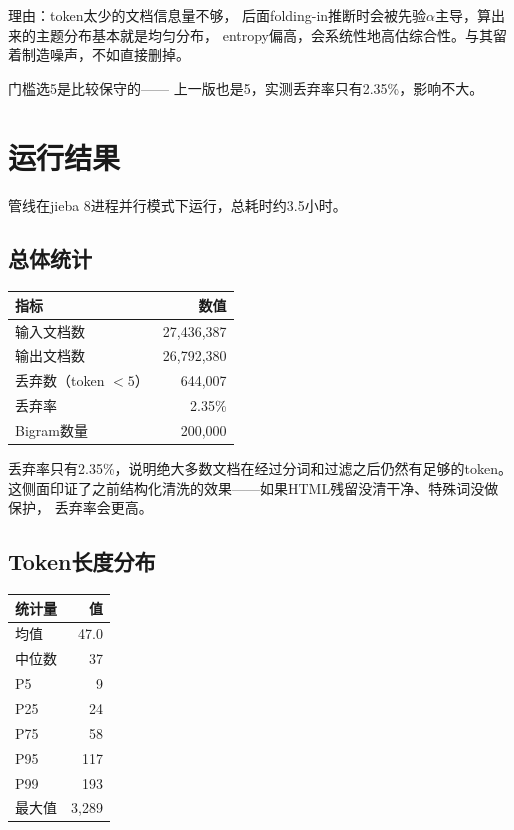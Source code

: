 \documentclass[12pt,a4paper]{ctexart}
\begin{document}
理由：token太少的文档信息量不够，
后面folding-in推断时会被先验$\alpha$主导，算出来的主题分布基本就是均匀分布，
entropy偏高，会系统性地高估综合性。与其留着制造噪声，不如直接删掉。

门槛选5是比较保守的——
上一版也是5，实测丢弃率只有2.35\%，影响不大。


\section{运行结果}
\label{sec:results}

管线在jieba 8进程并行模式下运行，总耗时约3.5小时。

\subsection{总体统计}

\begin{table}[h]
\centering
\begin{tabular}{lr}
\toprule
\textbf{指标} & \textbf{数值} \\
\midrule
输入文档数 & 27,436,387 \\
输出文档数 & 26,792,380 \\
丢弃数（token $< 5$） & 644,007 \\
丢弃率 & 2.35\% \\
Bigram数量 & 200,000 \\
\bottomrule
\end{tabular}
\end{table}

丢弃率只有2.35\%，说明绝大多数文档在经过分词和过滤之后仍然有足够的token。
这侧面印证了之前结构化清洗的效果——如果HTML残留没清干净、特殊词没做保护，
丢弃率会更高。


\subsection{Token长度分布}

\begin{table}[h]
\centering
\begin{tabular}{lr}
\toprule
\textbf{统计量} & \textbf{值} \\
\midrule
均值 & 47.0 \\
中位数 & 37 \\
P5 & 9 \\
P25 & 24 \\
P75 & 58 \\
P95 & 117 \\
P99 & 193 \\
最大值 & 3,289 \\
\bottomrule
\end{tabular}
\end{table}
\end{document}
